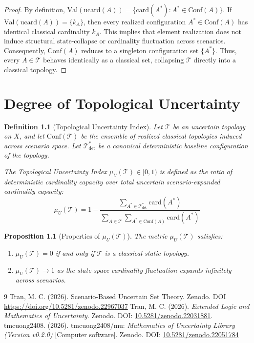 \documentclass[a4paper,14pt, twoside]{memoir}
\newtheorem{definition}{Definition}[chapter]
\newtheorem{proposition}{Proposition}[chapter]
\begin{document}
\begin{proof}
	By definition, $\mathrm{Val}(\mathrm{ucard}(A)) = \{ \mathrm{card}(A^*) : A^* \in \mathrm{Conf}(A) \}$. If $\mathrm{Val}(\mathrm{ucard}(A)) = \{k_A\}$, then every realized configuration $A^* \in \mathrm{Conf}(A)$ has identical classical cardinality $k_A$. This implies that element realization does not induce structural state-collapse or cardinality fluctuation across scenarios. Consequently, $\mathrm{Conf}(A)$ reduces to a singleton configuration set $\{A^*\}$. Thus, every $A \in \mathcal{T}$ behaves identically as a classical set, collapsing $\mathcal{T}$ directly into a classical topology.
\end{proof}

\chapter{Degree of Topological Uncertainty}

\begin{definition}[Topological Uncertainty Index]
	Let $\mathcal{T}$ be an uncertain topology on $X$, and let $\mathrm{Conf}(\mathcal{T})$ be the ensemble of realized classical topologies induced across scenario space. Let $\mathcal{T}_{\mathrm{det}}^*$ be a canonical deterministic baseline configuration of the topology. 

	The \emph{Topological Uncertainty Index} $\mu_U(\mathcal{T}) \in [0, 1)$ is defined as the ratio of deterministic cardinality capacity over total uncertain scenario-expanded cardinality capacity:
	\[
		\mu_U(\mathcal{T}) = 1 - \frac{\sum_{A^* \in \mathcal{T}_{\mathrm{det}}^*} \mathrm{card}(A^*)}{\sum_{A \in \mathcal{T}} \sum_{A^* \in \mathrm{Conf}(A)} \mathrm{card}(A^*)}
	\]
\end{definition}

\begin{proposition}[Properties of $\mu_U(\mathcal{T})$]
	The metric $\mu_U(\mathcal{T})$ satisfies:
	\begin{enumerate}[label=\alph*)]
		\item $\mu_U(\mathcal{T}) = 0$ if and only if $\mathcal{T}$ is a classical static topology.
		\item $\mu_U(\mathcal{T}) \to 1$ as the state-space cardinality fluctuation expands infinitely across scenarios.
	\end{enumerate}
\end{proposition}

\begin{thebibliography}{9}
	Tran, M. C. (2026). Scenario-Based Uncertain Set Theory. Zenodo. DOI \href{https://doi.org/10.5281/zenodo.22967037}{https://doi.org/10.5281/zenodo.22967037}
	Tran, M. C. (2026). \textit{Extended Logic and Mathematics of Uncertainty}. Zenodo. DOI: \href{https://doi.org/10.5281/zenodo.22031881}{10.5281/zenodo.22031881}.
	tmcuong2408. (2026). tmcuong2408/mu: \textit{Mathematics of Uncertainty Library (Version v0.2.0)} [Computer software]. Zenodo.
	DOI: \href{https://doi.org/10.5281/zenodo.22051784}{10.5281/zenodo.22051784}

\end{thebibliography}
\end{document}
